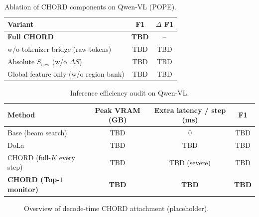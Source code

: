 \begin{table}[t]
  \centering
  \caption{Ablation of CHORD components on Qwen-VL (POPE).}
  \label{tab:ablation}
  \small
  \begin{tabular}{lcc}
    \toprule
    Variant & F1 & $\Delta$ F1 \\
    \midrule
    \textbf{Full CHORD} & \textbf{TBD} & -- \\
    w/o tokenizer bridge (raw tokens) & TBD & TBD \\
    Absolute $S_{\text{new}}$ (w/o $\Delta S$) & TBD & TBD \\
    Global feature only (w/o region bank) & TBD & TBD \\
    \bottomrule
  \end{tabular}
\end{table}

\begin{table}[t]
  \centering
  \caption{Inference efficiency audit on Qwen-VL.}
  \label{tab:efficiency}
  \small
  \begin{tabular}{lccc}
    \toprule
    Method & Peak VRAM (GB) & Extra latency / step (ms) & F1 \\
    \midrule
    Base (beam search) & TBD & 0 & TBD \\
    DoLa & TBD & TBD & TBD \\
    CHORD (full-$K$ every step) & TBD & TBD (severe) & TBD \\
    \textbf{CHORD (Top-$1$ monitor)} & \textbf{TBD} & \textbf{TBD} & \textbf{TBD} \\
    \bottomrule
  \end{tabular}
\end{table}

\begin{figure}[t]
  \centering
  \caption{Overview of decode-time CHORD attachment (placeholder).}
  \label{fig:overview}
\end{figure}
